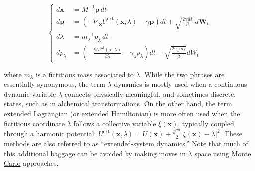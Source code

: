 \documentclass[9pt,review]{livecoms}
\newcommand{\vx}{\mathbf{x}}
\newcommand{\vp}{\mathbf{p}}
\begin{document}
\begin{equation}
\left\{
\begin{array}{ll}
d\vx &= M^{-1} \vp \, dt\\
d\vp &= \left(-\nabla_\vx U^\text{ext}(\vx,  \lambda) - \gamma \vp \right) dt
    + \sqrt{ \frac{2 \gamma M}{\beta}} \; d\mathbf{W}_t\\
d\lambda &= m_\lambda^{-1} p_\lambda \, dt \\
dp_\lambda &= \left(-\frac{\partial U^\text{ext}(\vx, \lambda)}{\partial \lambda} - \gamma_\lambda p_\lambda \right) dt
    + \sqrt{ \frac{2 \gamma_\lambda m_\lambda}{ \beta }} dW_t
\end{array}
\right.
\end{equation}

where $m_\lambda$ is a fictitious mass associated to $\lambda$.
While the two phrases are essentially synonymous, the term $\lambda$-dynamics is mostly used when a continuous dynamic variable $\lambda$ connects physically meaningful, and sometimes discrete, states, such as in \hyperlink{ref:Alchemical} {alchemical} transformations.
On the other hand, the term extended Lagrangian (or extended Hamiltonian) is more often used when the fictitious coordinate $\lambda$ follows a \hyperlink{ref:CV} {collective variable} $\xi(\vx)$, typically coupled through a harmonic potential: $U^\text{ext}(\vx, \lambda) = U(\vx) + \frac{k^\mathrm{ext}}{2}|\xi(\vx)-\lambda|^2$.
These methods are also referred to as ``extended-system dynamics.''  Note that much of this additional baggage can be avoided by making moves in $\lambda$ space using \hyperlink{ref:MetropolisMonteCarlo}{Monte Carlo} approaches.
\end{document}
